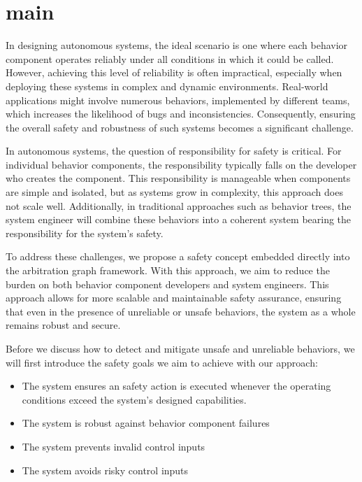\section{main}

In designing autonomous systems, the ideal scenario is one where each behavior component operates reliably under all conditions in which it could be called.
However, achieving this level of reliability is often impractical, especially when deploying these systems in complex and dynamic environments.
Real-world applications might involve numerous behaviors, implemented by different teams, which increases the likelihood of bugs and inconsistencies.
Consequently, ensuring the overall safety and robustness of such systems becomes a significant challenge.

In autonomous systems, the question of responsibility for safety is critical.
For individual behavior components, the responsibility typically falls on the developer who creates the component.
This responsibility is manageable when components are simple and isolated, but as systems grow in complexity, this approach does not scale well.
Additionally, in traditional approaches such as behavior trees, the system engineer will combine these behaviors into a coherent system bearing the responsibility for the system's safety.

To address these challenges, we propose a safety concept embedded directly into the arbitration graph framework.
With this approach, we aim to reduce the burden on both behavior component developers and system engineers.
This approach allows for more scalable and maintainable safety assurance, ensuring that even in the presence of unreliable or unsafe behaviors, the system as a whole remains robust and secure.

Before we discuss how to detect and mitigate unsafe and unreliable behaviors, we will first introduce the safety goals we aim to achieve with our approach:

\begin{itemize}
    \item The system ensures an safety action is executed whenever the operating conditions exceed the system's designed capabilities.
    \item The system is robust against behavior component failures
    \item The system prevents invalid control inputs
    \item The system avoids risky control inputs
\end{itemize}

